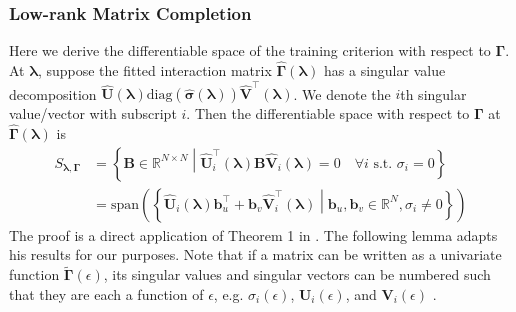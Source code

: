 \documentclass[12pt,letterpaper]{article}
\begin{document}
\subsubsection{Low-rank Matrix Completion}
Here we derive the differentiable space of the training criterion with respect to $\boldsymbol{\Gamma}$. At $\boldsymbol{\lambda}$, suppose the fitted interaction matrix $\hat{\boldsymbol{\Gamma}}(\boldsymbol{\lambda})$ has a singular value decomposition $\hat{\boldsymbol{U}}(\boldsymbol{\lambda}) \text{diag}(\hat{\boldsymbol{\sigma}}(\boldsymbol{\lambda})) \hat{\boldsymbol{V}}^\top(\boldsymbol{\lambda})$. We denote the $i$th singular value/vector with subscript $i$. Then the differentiable  space with respect to $\boldsymbol{\Gamma}$ at $\hat{\boldsymbol{\Gamma}}(\boldsymbol{\lambda})$ is
\begin{align}
S_{\boldsymbol{\lambda}, \boldsymbol{\Gamma}} & = 
\left\{
\boldsymbol{B} \in \mathbb{R}^{N \times N}
\middle |
\hat{\boldsymbol{U}}_i^\top(\boldsymbol{\lambda}) \boldsymbol{B} \hat{\boldsymbol{V}}_i(\boldsymbol{\lambda}) = 0 \quad \forall i \text{ s.t. } \sigma_i  = 0
\right\}
\\
& = 
\text{span} \left (
\left\{
\hat{\boldsymbol{U}}_i(\boldsymbol{\lambda}) \boldsymbol{b}_u^\top + \boldsymbol{b}_v \hat{\boldsymbol{V}}_i^\top(\boldsymbol{\lambda})
\middle |
\boldsymbol{b}_u, \boldsymbol{b}_v \in \mathbb{R}^{N},
\sigma_i \ne 0
\right\}
\right )
\label{eq:diff_space_gamma}
\end{align}
The proof is a direct application of Theorem 1 in \citet{watson1992characterization}. The following lemma adapts his results for our purposes. Note that if a matrix can be written as a univariate function $\tilde{\boldsymbol{\Gamma}}(\epsilon)$, its singular values and singular vectors can be numbered such that they are each a function of $\epsilon$, e.g. $\sigma_i(\epsilon)$, $\boldsymbol{U}_i(\epsilon)$, and $\boldsymbol{V}_i(\epsilon)$ \citep{rellich1969perturbation}.
\end{document}
